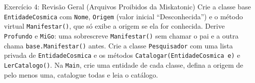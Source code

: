 \begin{exercicio}{Exercício 4: Revisão Geral (Arquivos Proibidos da Miskatonic)}
Crie a classe base \texttt{EntidadeCosmica} com \texttt{Nome}, \texttt{Origem} (valor inicial
``Desconhecida'') e o método virtual \texttt{Manifestar()}, que só exibe a origem se ela for
conhecida. Derive \texttt{Profundo} e \texttt{MiGo}: uma sobrescreve \texttt{Manifestar()} sem
chamar o pai e a outra chama \texttt{base.Manifestar()} antes. Crie a classe
\texttt{Pesquisador} com uma lista privada de \texttt{EntidadeCosmica} e os métodos
\texttt{Catalogar(EntidadeCosmica e)} e \texttt{LerCatalogo()}. Na \texttt{Main}, crie uma
entidade de cada classe, defina a origem de pelo menos uma, catalogue todas e leia o catálogo.
\end{exercicio}
